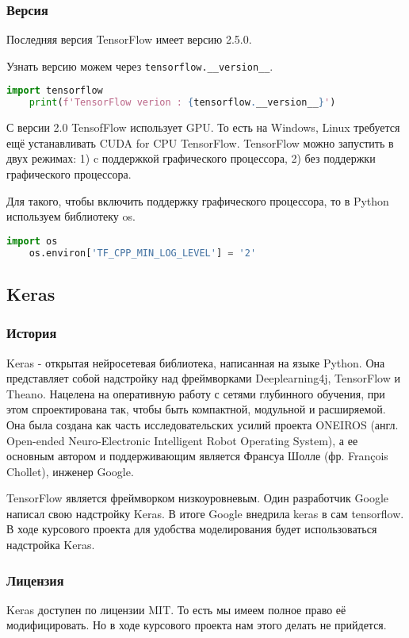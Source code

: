 \subsubsection{Версия}
Последняя версия TensorFlow имеет версию 2.5.0.

Узнать версию можем через \verb|tensorflow.__version__|.

\begin{lstlisting}[language=Python,]
    import tensorflow
    print(f'TensorFlow verion : {tensorflow.__version__}')
\end{lstlisting}

С версии 2.0 TensofFlow использует GPU.
То есть на Windows, Linux требуется ещё устанавливать CUDA for CPU TensorFlow.
TensorFlow можно запустить в двух режимах:
1) c поддержкой графического процессора,
2) без поддержки графического процессора.

Для такого, чтобы включить поддержку графического процессора,
то в Python используем библиотеку os.

\begin{lstlisting}[language=Python,]
    import os
    os.environ['TF_CPP_MIN_LOG_LEVEL'] = '2'
\end{lstlisting}

\subsection{Keras}

\subsubsection{История}
Keras - открытая нейросетевая библиотека,
написанная на языке Python.
Она представляет собой надстройку над фреймворками
Deeplearning4j, TensorFlow и Theano.
Нацелена на оперативную работу с сетями глубинного обучения,
при этом спроектирована так,
чтобы быть компактной,
модульной и расширяемой.
Она была создана как часть исследовательских усилий проекта ONEIROS
(англ. Open-ended Neuro-Electronic Intelligent Robot Operating System),
а ее основным автором и поддерживающим является Франсуа Шолле
(фр. François Chollet), инженер Google.

TensorFlow является фреймворком низкоуровневым.
Один разработчик Google написал свою надстройку Keras.
В итоге Google внедрила keras в сам tensorflow.
В ходе курсового проекта для удобства моделирования будет использоваться надстройка Keras.

\subsubsection{Лицензия}
Keras доступен по лицензии MIT. То есть мы имеем полное право её модифицировать. Но в ходе курсового проекта нам этого делать не прийдется.

